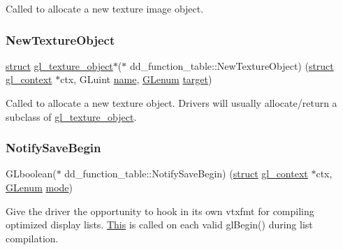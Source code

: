 Called to allocate a new texture image object. \mbox{\label{structdd__function__table_a80f07e92761e4295e1d99111bd149d8a}} 
\subsubsection{\texorpdfstring{New\+Texture\+Object}{NewTextureObject}}
{\footnotesize\ttfamily \hyperlink{interfacestruct}{struct} \hyperlink{structgl__texture__object}{gl\+\_\+texture\+\_\+object}$\ast$($\ast$ dd\+\_\+function\+\_\+table\+::\+New\+Texture\+Object) (\hyperlink{interfacestruct}{struct} \hyperlink{structgl__context}{gl\+\_\+context} $\ast$ctx, G\+Luint \hyperlink{structname}{name}, \hyperlink{interfacevoid}{G\+Lenum} \hyperlink{interfacevoid}{target})}

Called to allocate a new texture object. Drivers will usually allocate/return a subclass of \hyperlink{structgl__texture__object}{gl\+\_\+texture\+\_\+object}. \mbox{\label{structdd__function__table_a539816dbcf04eeb01fa8ae6e231e97cc}} 
\subsubsection{\texorpdfstring{Notify\+Save\+Begin}{NotifySaveBegin}}
{\footnotesize\ttfamily G\+Lboolean($\ast$ dd\+\_\+function\+\_\+table\+::\+Notify\+Save\+Begin) (\hyperlink{interfacestruct}{struct} \hyperlink{structgl__context}{gl\+\_\+context} $\ast$ctx, \hyperlink{interfacevoid}{G\+Lenum} \hyperlink{interfacevoid}{mode})}

Give the driver the opportunity to hook in its own vtxfmt for compiling optimized display lists. \hyperlink{namespace_this}{This} is called on each valid gl\+Begin() during list compilation. \mbox{\label{structdd__function__table_a57de2bc01cf4df1c5f7f7457083eacf1}} 
